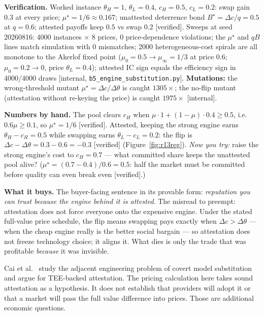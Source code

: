 \documentclass[11pt,a4paper]{article}
\begin{document}
\begin{thebox}
\textbf{Verification.} Worked instance $\theta_H{=}1$, $\theta_L{=}0.4$, $c_H{=}0.5$, $c_L{=}0.2$: swap gain $0.3$ at every price;
$\mu^\star=1/6\approx 0.167$; unattested deterrence bond $B^\star=\Delta c/q=0.5$ at $q=0.6$; attested payoffs keep $0.5$ vs swap
$0.2$ [verified]. Sweeps at seed 20260816: 4000 instances $\times$ 8 prices, 0 price-dependence violations; the $\mu^\star$ and
$qB$ lines match simulation with 0 mismatches; 2000 heterogeneous-cost spirals are all monotone to the Akerlof fixed point
($\mu_0{=}0.5\to\mu_\infty{=}1/3$ at price $0.6$; $\mu_0{=}0.2\to 0$, price $\theta_L{=}0.4$); attested IC sign equals the
efficiency sign in 4000/4000 draws [internal, \texttt{b5\_\allowbreak engine\_\allowbreak substitution.py}]. \textbf{Mutations:} the wrong-threshold
mutant $\mu^\star=\Delta c/\Delta\theta$ is caught $1305\times$; the no-flip mutant (attestation without re-keying the price) is
caught $1975\times$ [internal].
\end{thebox}

\textbf{Numbers by hand.} The pool clears $c_H$ when $\mu\cdot 1+(1-\mu)\cdot 0.4\ge 0.5$, i.e.\ $0.6\mu\ge 0.1$, so
$\mu^\star=1/6$ [verified]. Attested, keeping the strong engine earns $\theta_H-c_H=0.5$ while swapping earns
$\theta_L-c_L=0.2$: the flip is $\Delta c-\Delta\theta=0.3-0.6=-0.3$ [verified] (Figure~\ref{fig:r13reg}). \emph{Now you try:} raise the strong engine's cost
to $c_H=0.7$ --- what committed share keeps the unattested pool alive? ($\mu^\star=(0.7-0.4)/0.6=0.5$: half the market must be
committed before quality can even break even [verified].)



\textbf{What it buys.} The buyer-facing sentence in its provable form: \emph{reputation you can trust because the engine behind it
is attested}. The misread to preempt: attestation does not force everyone onto the expensive engine. Under the stated full-value price schedule, the flip means swapping pays
exactly when $\Delta c>\Delta\theta$ --- when the cheap engine really is the better social bargain --- so attestation does not
freeze technology choice; it aligns it. What dies is only the trade that was profitable \emph{because} it was invisible.

Cai et al.\ \cite{cai2025} study the adjacent engineering problem of covert model substitution and argue for TEE-backed attestation. The pricing calculation here takes sound attestation as a hypothesis. It does not establish that providers will adopt it or that a market will pass the full value difference into prices. Those are additional economic questions.
\end{document}
